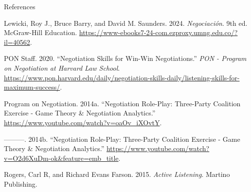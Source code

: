 \documentclass[
  ignorenonframetext,
]{beamer}
\newlength{\cslhangindent}
\newenvironment{CSLReferences}[2] %
 {\begin{list}{}{%
  \setlength{\itemindent}{0pt}
  \setlength{\leftmargin}{0pt}
  \setlength{\parsep}{0pt}
  \ifodd #1
   \setlength{\leftmargin}{\cslhangindent}
   \setlength{\itemindent}{-1\cslhangindent}
  \fi
  \setlength{\itemsep}{#2\baselineskip}}}
 {\end{list}}
\begin{document}
\begin{frame}[allowframebreaks]{References}
\label{refs}
\begin{CSLReferences}{1}{0}
Lewicki, Roy J., Bruce Barry, and David M. Saunders. 2024.
\emph{Negociación}. 9th ed. McGraw-Hill Education.
\url{https://www-ebooks7-24-com.ezproxy.umng.edu.co/?il=40562}.

PON Staff. 2020. {``Negotiation {Skills} for {Win}-{Win}
{Negotiations}.''} \emph{PON - Program on Negotiation at Harvard Law
School}.
\url{https://www.pon.harvard.edu/daily/negotiation-skills-daily/listening-skills-for-maximum-success/}.

Program on Negotiation. 2014a. {``Negotiation {Role}-{Play}:
{Three}-{Party} {Coalition} {Exercise} - {Game} {Theory} \&
{Negotiation} {Analytics}.''}
\url{https://www.youtube.com/watch?v=oaOv_iXOvtY}.

---------. 2014b. {``Negotiation {Role}-{Play}: {Three}-{Party}
{Coalition} {Exercise} - {Game} {Theory} \& {Negotiation}
{Analytics}.''}
\url{https://www.youtube.com/watch?v=O2d6XuDm-ok&feature=emb_title}.

Rogers, Carl R, and Richard Evans Farson. 2015. \emph{Active Listening}.
Martino Publishing.

\end{CSLReferences}
\end{frame}
\end{document}

